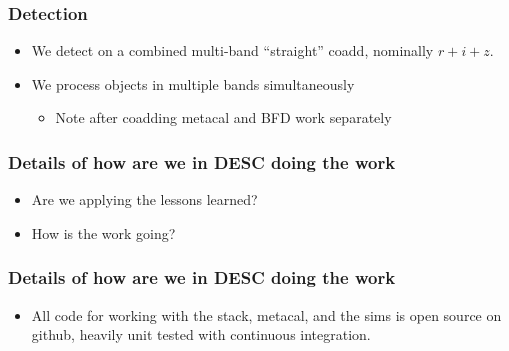 \documentclass{beamer}
\begin{document}
\frame
{

    \frametitle{Detection}


    \begin{itemize}

        \item We detect on a combined multi-band ``straight'' coadd, nominally
            $r+i+z$.

        \item We process objects in multiple bands simultaneously 

            \begin{itemize}

                \item Note after coadding metacal and BFD work separately

            \end{itemize}

    \end{itemize}

}

\frame
{

    \frametitle{Details of how are we in DESC doing the work}

    \begin{itemize}

        \item Are we applying the lessons learned?

        \item How is the work going?

    \end{itemize}

}

\frame
{

    \frametitle{Details of how are we in DESC doing the work}

    \begin{itemize}

        \item All code for working with the stack, metacal, and the sims is
            open source on github, heavily unit tested with continuous
            integration.

    \end{itemize}

}
\end{document}
